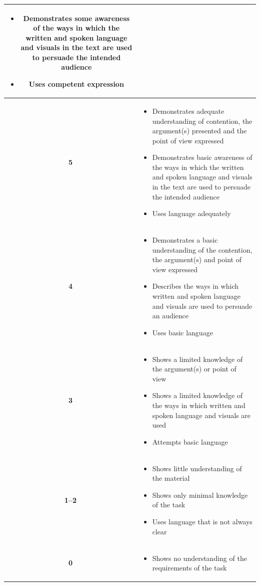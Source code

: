 \documentclass[a4paper]{article}
\begin{document}
\begin{longtable}{|c|p{13cm}|}
\begin{itemize}
  \item Demonstrates some awareness of the ways in which the written and spoken language and visuals in the text are used to persuade the intended audience
  \item Uses competent expression
\end{itemize} \\
\hline
\textbf{5} & 
\begin{itemize}
  \item Demonstrates adequate understanding of contention, the argument(s) presented and the point of view expressed
  \item Demonstrates basic awareness of the ways in which the written and spoken language and visuals in the text are used to persuade the intended audience
  \item Uses language adequately
\end{itemize} \\
\hline
\textbf{4} & 
\begin{itemize}
  \item Demonstrates a basic understanding of the contention, the argument(s) and point of view expressed
  \item Describes the ways in which written and spoken language and visuals are used to persuade an audience
  \item Uses basic language
\end{itemize} \\
\hline
\textbf{3} & 
\begin{itemize}
  \item Shows a limited knowledge of the argument(s) or point of view
  \item Shows a limited knowledge of the ways in which written and spoken language and visuals are used
  \item Attempts basic language
\end{itemize} \\
\hline
\textbf{1--2} & 
\begin{itemize}
  \item Shows little understanding of the material
  \item Shows only minimal knowledge of the task
  \item Uses language that is not always clear
\end{itemize} \\
\hline
\textbf{0} & 
\begin{itemize}
  \item Shows no understanding of the requirements of the task
\end{itemize} \\
\hline
\end{longtable}
\end{document}
